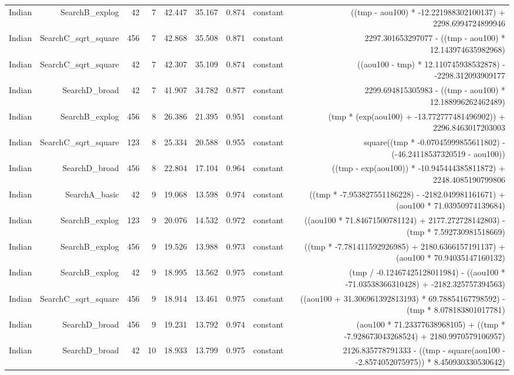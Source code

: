 \begin{table}
{\begin{tabular}{lrrrrrrrr}
Indian & SearchB\_explog & 42 & 7 & 42.447 & 35.167 & 0.874 & constant & ((tmp - aou100) * -12.221988302100137) + 2298.6994724899946 \\
Indian & SearchC\_sqrt\_square & 456 & 7 & 42.868 & 35.508 & 0.871 & constant & 2297.301653297077 - ((tmp - aou100) * 12.143974635982968) \\
Indian & SearchC\_sqrt\_square & 42 & 7 & 42.307 & 35.109 & 0.874 & constant & ((aou100 - tmp) * 12.110745938532878) - -2298.312093909177 \\
Indian & SearchD\_broad & 42 & 7 & 41.907 & 34.782 & 0.877 & constant & 2299.694815305983 - ((tmp - aou100) * 12.188996262462489) \\
Indian & SearchB\_explog & 456 & 8 & 26.386 & 21.395 & 0.951 & constant & (tmp * (exp(aou100) + -13.772777481496902)) + 2296.8463017203003 \\
Indian & SearchC\_sqrt\_square & 123 & 8 & 25.334 & 20.588 & 0.955 & constant & square((tmp * -0.07045999855611802) - (-46.24118537320519 - aou100)) \\
Indian & SearchD\_broad & 456 & 8 & 22.804 & 17.104 & 0.964 & constant & ((tmp - exp(aou100)) * -10.945444385811872) + 2248.4085190799806 \\
Indian & SearchA\_basic & 42 & 9 & 19.068 & 13.598 & 0.974 & constant & ((tmp * -7.953827551186228) - -2182.049981161671) + (aou100 * 71.03950974139684) \\
Indian & SearchB\_explog & 123 & 9 & 20.076 & 14.532 & 0.972 & constant & ((aou100 * 71.84671500781124) + 2177.272728142803) - (tmp * 7.592730981518669) \\
Indian & SearchB\_explog & 456 & 9 & 19.526 & 13.988 & 0.973 & constant & ((tmp * -7.781411592926985) + 2180.6366157191137) + (aou100 * 70.94035147160132) \\
Indian & SearchB\_explog & 42 & 9 & 18.995 & 13.562 & 0.975 & constant & (tmp / -0.12467425128011984) - ((aou100 * -71.03538366310428) + -2182.325757394563) \\
Indian & SearchC\_sqrt\_square & 456 & 9 & 18.914 & 13.461 & 0.975 & constant & ((aou100 + 31.306961392813193) * 69.78854167798592) - (tmp * 8.078183801017781) \\
Indian & SearchD\_broad & 456 & 9 & 19.231 & 13.792 & 0.974 & constant & (aou100 * 71.23377638968105) + ((tmp * -7.928673043268524) + 2180.9970579106957) \\
Indian & SearchD\_broad & 42 & 10 & 18.933 & 13.799 & 0.975 & constant & 2126.835778791333 - ((tmp - square(aou100 - -2.8574052075975)) * 8.450930330530642) \\

\end{tabular}}
\end{table}
